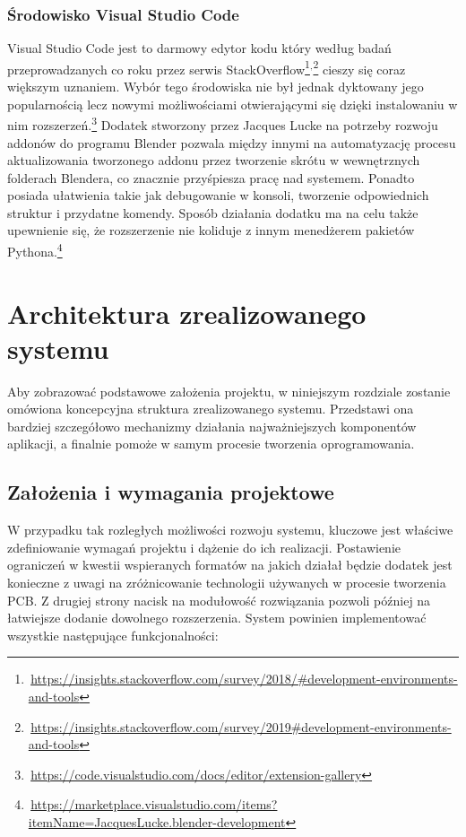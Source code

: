 \documentclass{xmgr}
\begin{document}
\subsection{Środowisko Visual Studio Code}
Visual Studio Code jest to darmowy edytor kodu który według badań przeprowadzanych co roku przez serwis StackOverflow\footnote{\,\url{https://insights.stackoverflow.com/survey/2018/\#development-environments-and-tools}}$^{,}$\footnote{\,\url{https://insights.stackoverflow.com/survey/2019\#development-environments-and-tools}} cieszy się coraz większym uznaniem. Wybór tego środowiska nie był jednak dyktowany jego popularnością lecz nowymi możliwościami otwierającymi się dzięki instalowaniu w nim rozszerzeń.\footnote{\,\url{https://code.visualstudio.com/docs/editor/extension-gallery}} Dodatek stworzony przez Jacques Lucke na potrzeby rozwoju addonów do programu Blender pozwala między innymi na automatyzację procesu aktualizowania tworzonego addonu przez tworzenie skrótu w wewnętrznych folderach Blendera, co znacznie przyśpiesza pracę nad systemem. Ponadto posiada ułatwienia takie jak debugowanie w konsoli, tworzenie odpowiednich struktur i przydatne komendy. Sposób działania dodatku ma na celu także upewnienie się, że rozszerzenie nie koliduje z innym menedżerem pakietów Pythona.\footnote{\,\url{https://marketplace.visualstudio.com/items?itemName=JacquesLucke.blender-development}} 

\chapter{Architektura zrealizowanego systemu}
Aby zobrazować podstawowe założenia projektu, w niniejszym rozdziale zostanie omówiona koncepcyjna struktura zrealizowanego systemu. Przedstawi ona bardziej szczegółowo mechanizmy działania najważniejszych komponentów aplikacji, a finalnie pomoże w samym procesie tworzenia oprogramowania.

\section{Założenia i wymagania projektowe}
W przypadku tak rozległych możliwości rozwoju systemu, kluczowe jest właściwe zdefiniowanie wymagań projektu i dążenie do ich realizacji. Postawienie ograniczeń w kwestii wspieranych formatów na jakich działał będzie dodatek jest konieczne z uwagi na zróżnicowanie technologii używanych w procesie tworzenia PCB. Z drugiej strony nacisk na modułowość rozwiązania pozwoli później na łatwiejsze dodanie dowolnego rozszerzenia.
System powinien implementować wszystkie następujące funkcjonalności:
\end{document}
